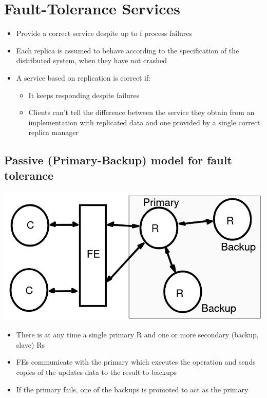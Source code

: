 \documentclass{article}[18pt]
\begin{document}
\section{Fault-Tolerance Services}
\begin{itemize}
	\item Provide a correct service despite up to f process failures
	\item Each replica is assumed to behave according to the specification of the distributed system, when they have not crashed
	\item A service based on replication is correct if:
	\begin{itemize}
		\item It keeps responding despite failures
		\item Clients can't tell the difference between the service they obtain from an implementation with replicated data and one provided by a single correct replica manager
	\end{itemize}
\end{itemize}
\subsection{Passive (Primary-Backup) model for fault tolerance}
\begin{center}
	\includegraphics[scale=0.7]{"Passive Fault Tolerance"}
\end{center}
\begin{itemize}
	\item There is at any time a single primary R and one or more secondary (backup, slave) Rs
	\item FEs communicate with the primary which executes the operation and sends copies of the updates data to the result to backups
	\item If the primary fails, one of the backups is promoted to act as the primary
\end{itemize}
\end{document}
